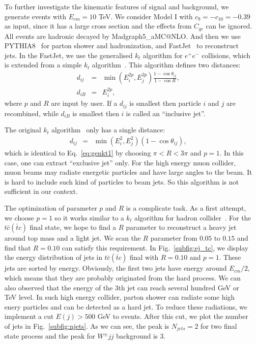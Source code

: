 \documentclass[a4paper,11pt]{article}
\makeatletter
\newcommand{\mgamc}{Madgraph5\_aMC@NLO}
\makeatother
\begin{document}
To further investigate the kinematic features of signal and background, we generate events with $E_{cm}=10$ TeV.
We consider Model I with $c_9=-c_{10}=-0.39$ as input, 
since it has a large cross section and the effects from $C_{qe}$ can be ignored.
All events are hadronic decayed by \mgamc. 
And then we use PYTHIA8~\cite{Bierlich:2022pfr} for parton shower and hadronization, 
and FastJet~\cite{Cacciari:2011ma} to reconstruct jets.  
In the FastJet, we use the generalised $k_t$ algorithm for $e^+e^-$ collisions, 
which is extended from a simple $k_t$ algorithm~\cite{Catani:1991hj}.
This algorithm defines two distances:
\begin{eqnarray}
  d_{ij} &=& \min(E^{2p}_i,E^{2p}_j)\frac{1-\cos\theta_{ij}}{1-\cos{R}}, \label{eq:genkt1}\\
  d_{iB} &=& E^{2p}_i, \label{eq:genkt2}
\end{eqnarray}
where $p$ and $R$ are input by user. 
If a $d_{ij}$ is smallest then particle $i$ and $j$ are recombined, while $d_{iB}$ is smallest then $i$ is called an ``inclusive jet''.

The original $k_t$ algorithm~\cite{Catani:1991hj} only has a single distance:
\begin{eqnarray}
  d_{ij} &=& \min(E^{2}_i,E^{2}_j)\left(1-\cos\theta_{ij}\right), \label{eq:eekt}
\end{eqnarray}
which is identical to Eq.~\ref{eq:genkt1} by choosing $\pi<R<3\pi$ and $p=1$.
In this case, one can extract ``exclusive jet'' only. 
For the high energy muon collider, muon beams may radiate energetic particles and have large angles to the beam.
It is hard to include such kind of particles to beam jets. 
So this algorithm is not sufficient in our context.

The optimization of parameter $p$ and $R$ is a complicate task.
As a first attempt, we choose $p=1$ so it works similar to a $k_t$ algorithm for hadron collider~\cite{Catani:1993hr,Ellis:1993tq}. 
For the $t\bar{c}(\bar{t}c)$ final state, we hope to find a $R$ parameter to reconstruct a heavy jet around top mass and a light jet.
We scan the $R$ parameter from $0.05$ to $0.15$ and find that $R=0.10$ can satisfy this requirement. 
In Fig.~\ref{subfig:ej_tc}, we display the energy distribution of jets in $t\bar{c}(\bar{t}c)$ final with $R=0.10$ and $p=1$. 
These jets are sorted by energy. 
Obviously, the first two jets have energy around $E_{cm}/2$, 
which means that they are probably originated from the hard process.
We can also observed that the energy of the 3th jet can reach several hundred GeV or TeV level.
In such high energy collider, parton shower can radiate some high enery particles and can be detected as a hard jet. 
To reduce these radiations, we implement a cut $E(j)>500$ GeV to events. 
After this cut, we plot the number of jets in Fig.~\ref{subfig:njets}. 
As we can see, the peak is $N_{jets}=2$ for two final state process and the peak for $W^{\pm}jj$ background is 3. 
\end{document}
